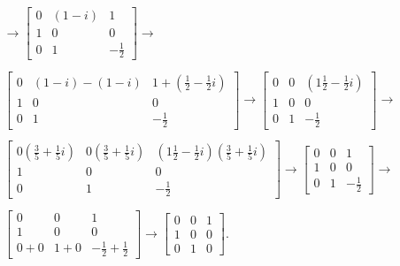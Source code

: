 \documentclass[12pt]{article}
\begin{document}
\begin{enumerate}
\begin{align*}
        \xrightarrow{}
        \begin{bmatrix}
          0 & (1 - i) &  1\\
          1 & 0  &  0\\
          0 & 1 & -\frac{1}{2}
        \end{bmatrix}
        \xrightarrow{}\\\\
        \begin{bmatrix}
          0 & (1 - i) - (1 - i) & 1 + (\frac{1}{2} - \frac{1}{2}i)\\
          1 & 0 & 0\\
          0 & 1 & -\frac{1}{2}
        \end{bmatrix}
        \xrightarrow{}
        \begin{bmatrix}
          0 & 0 & (1\frac{1}{2} - \frac{1}{2}i)\\
          1 & 0 & 0\\
          0 & 1 & -\frac{1}{2}
        \end{bmatrix}
        \xrightarrow{}\\\\
        \begin{bmatrix}
          0(\frac{3}{5} + \frac{1}{5}i) & 0(\frac{3}{5} + \frac{1}{5}i) & (1\frac{1}{2} - \frac{1}{2}i)(\frac{3}{5} + \frac{1}{5}i)\\
          1 & 0 & 0\\
          0 & 1 & -\frac{1}{2}
        \end{bmatrix}
        \xrightarrow{}
        \begin{bmatrix}
          0 & 0 & 1\\
          1 & 0 & 0\\
          0 & 1 & -\frac{1}{2}
        \end{bmatrix}
        \xrightarrow{}\\\\
        \begin{bmatrix}
          0 & 0 & 1\\
          1 & 0 & 0\\
          0 + 0 & 1 + 0 & -\frac{1}{2} + \frac{1}{2}
        \end{bmatrix}
        \xrightarrow{}
        \begin{bmatrix}
          0 & 0 & 1\\
          1 & 0 & 0\\
          0 & 1 & 0
        \end{bmatrix}.
      \end{align*}


\end{enumerate}
\end{document}

